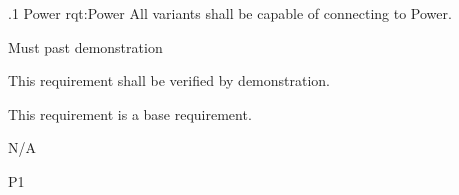 \ONERQMTVKPP
{\RqtNumberBase.1}
{Power}
{rqt:Power}
{All \ThisSys variants shall be capable of connecting to \TBD Power.}
{
	\item [Phase 1] Must past demonstration
}
{This requirement shall be verified by demonstration.}
{
	\item [N/A] This requirement is a base requirement.
}
{
  \item N/A
}
{P1}


